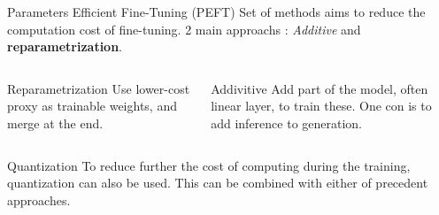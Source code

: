 \begin{frame}{Parameters Efficient Fine-Tuning (PEFT)}
    Set of methods aims to reduce the computation cost of fine-tuning. 2 main approachs : \textit{Additive} and \textbf{reparametrization}.
    
    \begin{columns}  
  
        \begin{column}[t]{0.45\textwidth}
        \begin{block}{Reparametrization}
            Use lower-cost proxy as trainable weights, and merge at the end.
        \end{block}
        \end{column}
    
        \begin{column}[t]{0.45\textwidth}
        \begin{block}{Addivitive}
            Add part of the model, often linear layer, to train these.  One con is to add inference to generation.
            
        \end{block}
        \end{column}
      
    \end{columns}

    \begin{block}{Quantization}
        To reduce further the cost of computing during the training, quantization can also be used. This can be combined with either of precedent approaches. 
        
    \end{block}

\end{frame}



